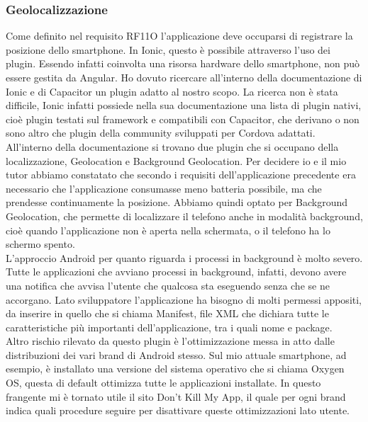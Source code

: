 \subsubsection{Geolocalizzazione}
Come definito nel requisito RF11O l'applicazione deve occuparsi di registrare la posizione dello smartphone. In Ionic, questo è possibile
attraverso l'uso dei plugin. Essendo infatti coinvolta una risorsa hardware dello smartphone, non può essere gestita da Angular. Ho dovuto
ricercare all'interno della documentazione di Ionic e di Capacitor un plugin adatto al nostro scopo. La ricerca non è stata difficile, Ionic
infatti possiede nella sua documentazione una lista di plugin nativi, cioè plugin testati sul framework e compatibili con Capacitor, che
derivano o non sono altro che plugin della community sviluppati per Cordova adattati. \\
\noindent All'interno della documentazione si trovano due plugin che si occupano della localizzazione, Geolocation e Background Geolocation.
Per decidere io e il mio tutor abbiamo constatato che secondo i requisiti dell'applicazione precedente era necessario che l'applicazione
consumasse meno batteria possibile, ma che prendesse continuamente la posizione. Abbiamo quindi optato per Background Geolocation, che
permette di localizzare il telefono anche in modalità background, cioè quando l'applicazione non è aperta nella schermata, o il telefono ha
lo schermo spento. \\
\noindent L'approccio Android per quanto riguarda i processi in background è molto severo. Tutte le applicazioni che avviano processi in
background, infatti, devono avere una notifica che avvisa l'utente che qualcosa sta eseguendo senza che se ne accorgano. Lato sviluppatore
l'applicazione ha bisogno di molti permessi appositi, da inserire in quello che si chiama Manifest, file XML che dichiara tutte le
caratteristiche più importanti dell'applicazione, tra i quali nome e package. \\
Altro rischio rilevato da questo plugin è l'ottimizzazione messa in atto dalle distribuzioni dei vari brand di Android stesso. Sul mio
attuale smartphone, ad esempio, è installato una versione del sistema operativo che si chiama Oxygen OS, questa di default ottimizza tutte
le applicazioni installate. In questo frangente mi è tornato utile il sito Don't Kill My App, il quale per ogni brand indica quali procedure
seguire per disattivare queste ottimizzazioni lato utente.

